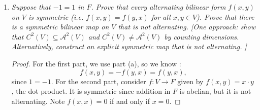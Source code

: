 \documentclass[10pt,oneside,reqno]{amsart}
\theoremstyle{plain}
\theoremstyle{definition}
\theoremstyle{remark}
\newcommand{\sub}{\subseteq}
\newcommand{\mc}{\mathcal}
\begin{document}
\begin{enumerate}[label=\arabic*.]
\begin{enumerate}
\item \textit{Suppose that $-1 = 1$ in $F$. Prove that every alternating bilinear form $f(x,y)$ on $V$ is symmetric (i.e. $f(x,y) = f(y,x)$ for all $x,y \in V$). Prove that there is a symmetric bilinear map on $V$ that is not alternating. [One approach: show that $C^2(V) \sub \mc{A}^2(V)$ and $C^2(V) \neq \mc{A}^2(V)$ by counting dimensions. Alternatively, construct an explicit symmetric map that is not alternating. ]}

\begin{proof}
For the first part, we use part (a), so we know :
$$
f(x,y) = -f(y,x) = f(y,x),
$$
 since $1 = -1$. For the second part, consider $f:V \to F$ given by $f(x,y) = x \cdot y$, the dot product. It is symmetric since addition in $F$ is abelian, but it is not alternating. Note $f(x,x) = 0$ if and only if $x = 0$. 
\end{proof}


\end{enumerate}

\end{enumerate}
\end{document}
